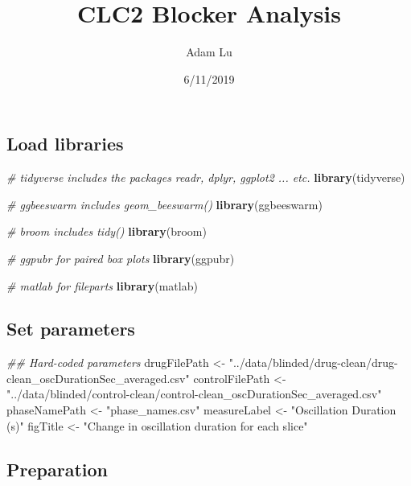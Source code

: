 \documentclass[]{article}
\title{CLC2 Blocker Analysis}
\author{Adam Lu}
\date{6/11/2019}
\newenvironment{Shaded}{\begin{snugshade}}{\end{snugshade}}
\newcommand{\CommentTok}[1]{\textcolor[rgb]{0.56,0.35,0.01}{\textit{#1}}}
\newcommand{\KeywordTok}[1]{\textcolor[rgb]{0.13,0.29,0.53}{\textbf{#1}}}
\newcommand{\NormalTok}[1]{#1}
\newcommand{\StringTok}[1]{\textcolor[rgb]{0.31,0.60,0.02}{#1}}
\begin{document}
\maketitle

\hypertarget{load-libraries}{%
\subsection{Load libraries}\label{load-libraries}}

\begin{Shaded}
\begin{Highlighting}[]
\CommentTok{# tidyverse includes the packages readr, dplyr, ggplot2 ... etc.}
\KeywordTok{library}\NormalTok{(tidyverse)}

\CommentTok{# ggbeeswarm includes geom_beeswarm()}
\KeywordTok{library}\NormalTok{(ggbeeswarm)}

\CommentTok{# broom includes tidy()}
\KeywordTok{library}\NormalTok{(broom)}

\CommentTok{# ggpubr for paired box plots}
\KeywordTok{library}\NormalTok{(ggpubr)}

\CommentTok{# matlab for fileparts}
\KeywordTok{library}\NormalTok{(matlab)}
\end{Highlighting}
\end{Shaded}

\hypertarget{set-parameters}{%
\subsection{Set parameters}\label{set-parameters}}

\begin{Shaded}
\begin{Highlighting}[]
\CommentTok{## Hard-coded parameters}
\NormalTok{drugFilePath <-}\StringTok{ "../data/blinded/drug-clean/drug-clean_oscDurationSec_averaged.csv"}
\NormalTok{controlFilePath <-}\StringTok{ "../data/blinded/control-clean/control-clean_oscDurationSec_averaged.csv"}
\NormalTok{phaseNamePath <-}\StringTok{ "phase_names.csv"}
\NormalTok{measureLabel <-}\StringTok{ "Oscillation Duration (s)"}
\NormalTok{figTitle <-}\StringTok{ "Change in oscillation duration for each slice"}
\end{Highlighting}
\end{Shaded}

\hypertarget{preparation}{%
\subsection{Preparation}\label{preparation}}
\end{document}
